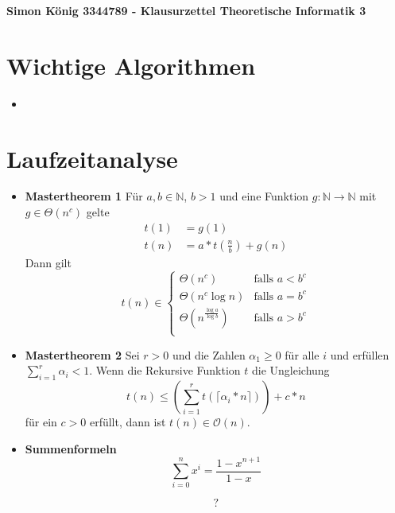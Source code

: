 \documentclass[landscape, 8pt, a4paper]{extarticle}
\newcommand{\N}{\mathbb{N}}
\renewcommand{\O}{\mathcal O}
\begin{document}
\begin{multicols}{3}
	\textbf{Simon König 3344789 - Klausurzettel Theoretische Informatik 3}

	\section{Wichtige Algorithmen}
	\begin{itemize}
		\item 
	\end{itemize}

	\section{Laufzeitanalyse}

	\begin{itemize}
		\item \textbf{Mastertheorem 1} Für $a,b\in\N$, $b>1$ und eine Funktion $g:\N\rightarrow \N$ mit $g\in\Theta(n^c)$ gelte
		\begin{align*}
			t(1)&=g(1)\\
			t(n)&=a*t\left(\frac nb\right)+g(n)
		\end{align*}
		Dann gilt 
		\begin{equation*}
			t(n)\in\begin{cases}
			\Theta(n^c)&\text{falls }a<b^c\\
			\Theta(n^c\log n)&\text{falls }a=b^c\\
			\Theta(n^{\frac{\log a}{\log b}})&\text{falls }a>b^c\\
			\end{cases}
		\end{equation*}

		\item \textbf{Mastertheorem 2} Sei $r>0$ und die Zahlen $\alpha_1\geq 0$ für alle $i$ und erfüllen $\sum_{i=1}^r\alpha_i<1$.
		Wenn die Rekursive Funktion $t$ die Ungleichung
		\begin{equation*}
			t(n)\leq \left( \sum_{i=1}^r t(\lceil \alpha_i*n\rceil) \right)+c*n
		\end{equation*}
		für ein $c>0$ erfüllt, dann ist $t(n)\in\O(n)$.

		\item \textbf{Summenformeln}
		\begin{equation*}
			\sum_{i=0}^n x^i = \frac{1-x^{n+1}}{1-x}
		\end{equation*}

		\begin{equation*}
			?
		\end{equation*}
	\end{itemize}




\end{multicols}
\end{document}
